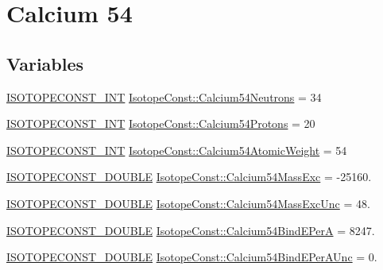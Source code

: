 \hypertarget{group___isotope_const-_calcium-_ca54}{}\section{Calcium 54}
\label{group___isotope_const-_calcium-_ca54}
\subsection*{Variables}
\begin{DoxyCompactItemize}
\item 
\mbox{\hyperlink{group___isotope_const-_macros_ga5f18360b3e99483a35c32d789e62621c}{I\+S\+O\+T\+O\+P\+E\+C\+O\+N\+S\+T\+\_\+\+I\+NT}} \mbox{\hyperlink{group___isotope_const-_calcium-_ca54_gac1a8c9fd65b31a269f26834ace215e1e}{Isotope\+Const\+::\+Calcium54\+Neutrons}} = 34
\item 
\mbox{\hyperlink{group___isotope_const-_macros_ga5f18360b3e99483a35c32d789e62621c}{I\+S\+O\+T\+O\+P\+E\+C\+O\+N\+S\+T\+\_\+\+I\+NT}} \mbox{\hyperlink{group___isotope_const-_calcium-_ca54_gaacb49cab22ed893cf9f0f1bdd0514388}{Isotope\+Const\+::\+Calcium54\+Protons}} = 20
\item 
\mbox{\hyperlink{group___isotope_const-_macros_ga5f18360b3e99483a35c32d789e62621c}{I\+S\+O\+T\+O\+P\+E\+C\+O\+N\+S\+T\+\_\+\+I\+NT}} \mbox{\hyperlink{group___isotope_const-_calcium-_ca54_ga18deec27160ff7e917ba364cba551a07}{Isotope\+Const\+::\+Calcium54\+Atomic\+Weight}} = 54
\item 
\mbox{\hyperlink{group___isotope_const-_macros_ga8f45a7272ce02c0b4c65c44636ed719a}{I\+S\+O\+T\+O\+P\+E\+C\+O\+N\+S\+T\+\_\+\+D\+O\+U\+B\+LE}} \mbox{\hyperlink{group___isotope_const-_calcium-_ca54_ga5189374d10273a09282e1fae4e7f5e82}{Isotope\+Const\+::\+Calcium54\+Mass\+Exc}} = -\/25160.
\item 
\mbox{\hyperlink{group___isotope_const-_macros_ga8f45a7272ce02c0b4c65c44636ed719a}{I\+S\+O\+T\+O\+P\+E\+C\+O\+N\+S\+T\+\_\+\+D\+O\+U\+B\+LE}} \mbox{\hyperlink{group___isotope_const-_calcium-_ca54_gafb35091466d9620c5d1cccfb3da11aab}{Isotope\+Const\+::\+Calcium54\+Mass\+Exc\+Unc}} = 48.
\item 
\mbox{\hyperlink{group___isotope_const-_macros_ga8f45a7272ce02c0b4c65c44636ed719a}{I\+S\+O\+T\+O\+P\+E\+C\+O\+N\+S\+T\+\_\+\+D\+O\+U\+B\+LE}} \mbox{\hyperlink{group___isotope_const-_calcium-_ca54_ga00416920e79d241c1a3915a658d3e791}{Isotope\+Const\+::\+Calcium54\+Bind\+E\+PerA}} = 8247.
\item 
\mbox{\hyperlink{group___isotope_const-_macros_ga8f45a7272ce02c0b4c65c44636ed719a}{I\+S\+O\+T\+O\+P\+E\+C\+O\+N\+S\+T\+\_\+\+D\+O\+U\+B\+LE}} \mbox{\hyperlink{group___isotope_const-_calcium-_ca54_ga813ebf9423d3518bb87b46b3357eeb33}{Isotope\+Const\+::\+Calcium54\+Bind\+E\+Per\+A\+Unc}} = 0.

\end{DoxyCompactItemize}

